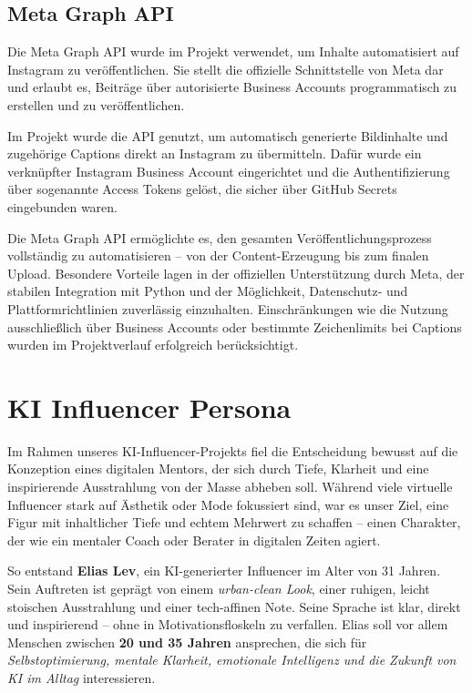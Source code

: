 \documentclass[a4paper,12pt]{article}
\begin{document}
\subsection{Meta Graph API}

Die Meta Graph API wurde im Projekt verwendet, um Inhalte automatisiert auf Instagram zu veröffentlichen. Sie stellt die offizielle Schnittstelle von Meta dar und erlaubt es, Beiträge über autorisierte Business Accounts programmatisch zu erstellen und zu veröffentlichen. 

Im Projekt wurde die API genutzt, um automatisch generierte Bildinhalte und zugehörige Captions direkt an Instagram zu übermitteln. Dafür wurde ein verknüpfter Instagram Business Account eingerichtet und die Authentifizierung über sogenannte Access Tokens gelöst, die sicher über GitHub Secrets eingebunden waren. 

Die Meta Graph API ermöglichte es, den gesamten Veröffentlichungsprozess vollständig zu automatisieren – von der Content-Erzeugung bis zum finalen Upload. Besondere Vorteile lagen in der offiziellen Unterstützung durch Meta, der stabilen Integration mit Python und der Möglichkeit, Datenschutz- und Plattformrichtlinien zuverlässig einzuhalten. Einschränkungen wie die Nutzung ausschließlich über Business Accounts oder bestimmte Zeichenlimits bei Captions wurden im Projektverlauf erfolgreich berücksichtigt.


\section{KI Influencer Persona}

Im Rahmen unseres KI-Influencer-Projekts fiel die Entscheidung bewusst auf die Konzeption eines digitalen Mentors, der sich durch Tiefe, Klarheit und eine inspirierende Ausstrahlung von der Masse abheben soll. Während viele virtuelle Influencer stark auf Ästhetik oder Mode fokussiert sind, war es unser Ziel, eine Figur mit inhaltlicher Tiefe und echtem Mehrwert zu schaffen – einen Charakter, der wie ein mentaler Coach oder Berater in digitalen Zeiten agiert.

So entstand \textbf{Elias Lev}, ein KI-generierter Influencer im Alter von 31 Jahren. Sein Auftreten ist geprägt von einem \textit{urban-clean Look}, einer ruhigen, leicht stoischen Ausstrahlung und einer tech-affinen Note. Seine Sprache ist klar, direkt und inspirierend – ohne in Motivationsfloskeln zu verfallen. Elias soll vor allem Menschen zwischen \textbf{20 und 35 Jahren} ansprechen, die sich für \textit{Selbstoptimierung, mentale Klarheit, emotionale Intelligenz und die Zukunft von KI im Alltag} interessieren.
\end{document}
